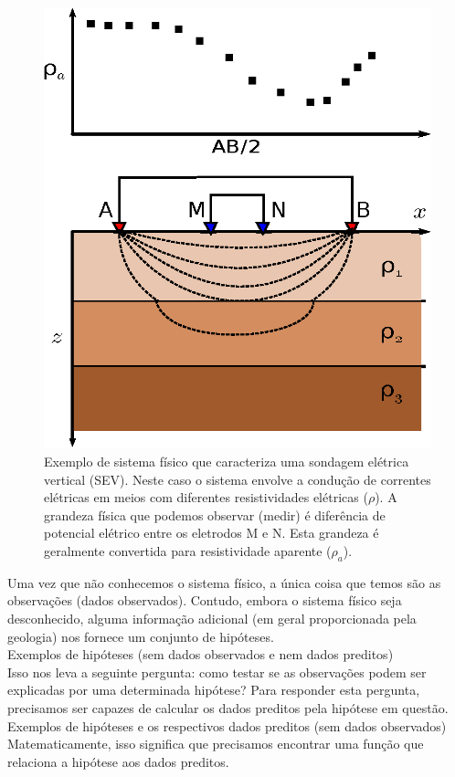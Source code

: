 \begin{figure}
    \centering
    \includegraphics[scale=1]{../figs/system-sev.eps}
    \caption{Exemplo de sistema físico que caracteriza uma sondagem elétrica
        vertical (SEV). Neste caso o sistema envolve a condução de correntes
        elétricas em meios com diferentes resistividades elétricas ($\rho$).
        A grandeza física que podemos observar (medir) é diferência de potencial
        elétrico entre os eletrodos M e N. Esta grandeza é geralmente convertida
        para resistividade aparente ($\rho_a$).}
    \label{system-sev}
\end{figure}

\indent Uma vez que não conhecemos o sistema físico, a única coisa que temos são as
observações (dados observados). Contudo, embora o sistema físico seja
desconhecido, alguma informação adicional (em geral proporcionada pela geologia)
nos fornece um conjunto de hipóteses.
\\
Exemplos de hipóteses (sem dados observados e nem dados preditos)
\\
\indent Isso nos leva a seguinte pergunta: como testar se as observações podem ser
explicadas por uma determinada hipótese? Para responder esta pergunta,
precisamos ser capazes de calcular os dados preditos pela hipótese em questão.
\\
Exemplos de hipóteses e os respectivos dados preditos (sem dados observados)
\\
\indent Matematicamente, isso significa que precisamos encontrar uma função que
relaciona a hipótese aos dados preditos.

